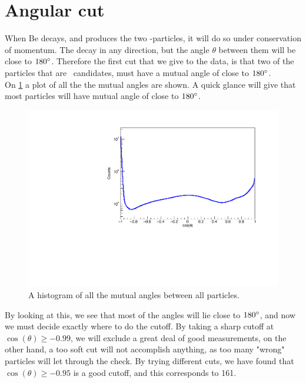 \section{Angular cut}
When \isotope[8][]Be decays, and produces the two \al-particles, it will do so under conservation of momentum. The decay in any direction, but the angle $\theta$ between them will be close to  $180\degree$. Therefore the first cut that we give to the data, is that two of the particles that are \al\ candidates, must have a mutual angle of close to $180\degree$.\\


On \cref{fig:cosAll} a plot of all the the mutual angles are shown. A quick glance will give that most particles will have mutual angle of close to $180\degree$. 

\begin{figure}[h]
	\centering
	\includegraphics[width=\linewidth]{../figures/cosang.pdf}
	\caption{A histogram of all the mutual angles between all particles.}
	\label{fig:cosAll}
\end{figure}

By looking at this, we see that most of the angles will lie close to $180\degree$, and now we must decide exactly where to do the cutoff. 
By taking a sharp cutoff at $\cos(\theta) \geq -0.99$, we will exclude a great deal of good measurements, on the other hand, a too soft cut will not accomplish anything, as too many "wrong" particles will let through the check. By trying different cuts, we have found that $\cos(\theta) \geq -0.95$ is a good cutoff, and this corresponds to 161\degree. 



